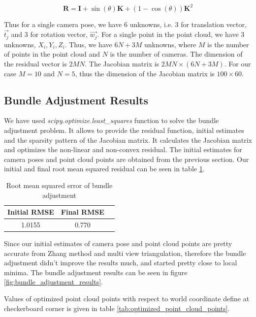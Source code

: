 \documentclass{article}
\begin{document}

\begin{equation}
    \mathbf{R} = \mathbf{I} + \sin(\theta) \mathbf{K} + (1 - \cos(\theta)) \mathbf{K}^2
\end{equation}

Thus for a single camera pose, we have 6 unknowns, i.e. 3 for translation vector, $\vec{t_j}$ and 3 for rotation vector, $\vec{w_j}$. For a single point in the point cloud, 
we have 3 unknowns, $X_i, Y_i, Z_i$. Thus, we have $6N + 3M$ unknowns, where $M$ is the number of points in the point cloud and $N$ is the number of cameras. 
The dimension of the residual vector is $2MN$. The Jacobian matrix is $2MN \times (6N + 3M)$. For our case $M = 10$ and $N = 5$, thus the dimension of the Jacobian matrix is $100 \times 60$.


\subsection{Bundle Adjustment Results}
We have used \textit{scipy.optimize.least\_squares} function to solve the bundle adjustment problem. It allows to provide the residual function, initial estimates and the sparsity pattern of the Jacobian matrix.
It calculates the Jacobian matrix and optimizes the non-linear and non-convex residual. The initial estimates for camera poses and point cloud points are obtained from the previous section.
Our initial and final root mean squared residual can be seen in table \ref{tab:bundle_adjustment_rmse}.

\begin{table}[h]
    \centering
    \begin{tabular}{|c|c|c|}
        \hline
        Initial RMSE & Final RMSE \\
        \hline
        1.0155 & 0.770 \\
        \hline
    \end{tabular}
    \caption{Root mean squared error of bundle adjustment}
    \label{tab:bundle_adjustment_rmse}
\end{table}

Since our initial estimates of camera pose and point cloud points are pretty accurate from Zhang method and multi view triangulation, therefore the bundle adjustment didn't improve the results much, and started 
pretty close to local minima. The bundle adjustment results can be seen in figure \ref{fig:bundle_adjustment_results}.

Values of optimized point cloud points with respect to world coordinate define at checkerboard corner is given in table \ref{tab:optimized_point_cloud_points}.
\end{document}
